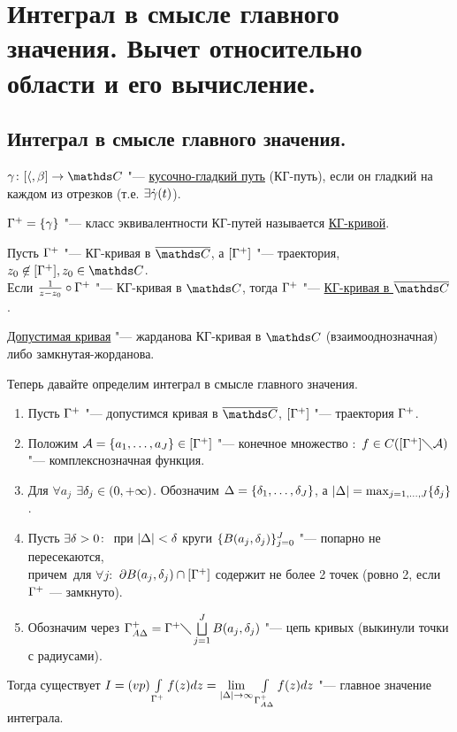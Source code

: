 \newpage
\section{Интеграл в смысле главного значения. Вычет относительно области и его вычисление.}

\subsection{Интеграл в смысле главного значения.}
\begin{Def} 
$\g\colon[\a,\b]\to\C$ "--- \underline{кусочно-гладкий путь} (КГ-путь), если он гладкий на каждом из отрезков (т.е. $\exists \dot{\gamma}(t)$).
\end{Def}

\begin{Def} 
$\Gamma^{+} = \{\gamma \} $ "--- класс эквивалентности КГ-путей называется \underline{КГ-кривой}.
\end{Def}


\begin{Def} 
Пусть $\Gamma^{+}$ "--- КГ-кривая в $\ol\C$, а $[\Gamma^{+}]$ "--- траектория, $z_0 \not\in [\GG], z_0 \in \C$.\\ 
Если $\frac{1}{z-z_0}\circ\Gamma^{+}$ "--- КГ-кривая в $\C$, тогда $\Gamma^{+}$ "--- \underline{КГ-кривая в $\ol\C$}.
\end{Def}


\begin{Def} 
\underline{Допустимая кривая} "--- жарданова КГ-кривая в $\C$ (взаимооднозначная) либо замкнутая-жорданова.
\end{Def}

Теперь давайте определим интеграл в смысле главного значения. 
\begin{enumerate}
\item Пусть $\Gamma^{+}$ "--- допустимся кривая в $\ol\C$, $[\Gamma^{+}]$ "--- траектория $\Gamma^{+}$. 
\item Положим $\mathcal A = \{a_1,\dots,a_J\} \in [\Gamma^{+}]$ "--- конечное множество $\colon$ $f \in C([\Gamma^{+}] \diagdown \mathcal A)$ "--- комплекснозначная функция.
\item Для $\forall a_j$ $\exists \delta_j \in (0,+\infty)$. Обозначим $\Delta = \{\delta_1,\dots,\delta_J\}$, а $|\Delta| = {\max_{j=1,\dots,J}} \{\delta_j\}$.
\item Пусть $\exists \delta > 0 \colon$  при $|\Delta| < \delta$ круги $\{B(a_j,\delta_j)\}_{j=0}^J$ "--- попарно не пересекаются, \\
причем~для $\forall j\colon$ $\partial B(a_j,\delta_j) \cap [\Gamma^{+}]$ содержит не более 2 точек (ровно 2, если $\Gamma^{+}$ --- замкнуто).  
\item Обозначим через $\Gamma^{+}_{A\Delta} = \Gamma^{+} \diagdown \bigsqcup\limits_{j=1}^J B(a_j,\delta_j)$ "--- цепь кривых (выкинули точки с радиусами).
\end{enumerate}
Тогда существует $I = (vp)\int\limits_{\Gamma^{+}} f(z)dz = \lim\limits_{|\Delta| \rightarrow \infty} \int\limits_{\Gamma^{+}_{A\Delta}} f(z)dz$ "--- главное значение интеграла.

